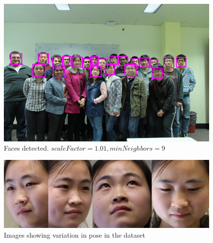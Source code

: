 \documentclass{article}
\begin{document}



\pagebreak

\begin{figure}[H]
\centering
\includegraphics[width=0.7\linewidth]{./groupdetected}
\caption{Faces detected. $scaleFactor=1.01, minNeighbors=9$}
\label{fig:group}
\end{figure}

\begin{figure}[H]
\centering
\includegraphics[width=0.7\linewidth]{./pose}
\caption{Images showing variation in pose in the dataset}
\label{fig:pose}
\end{figure} %
\end{document}
